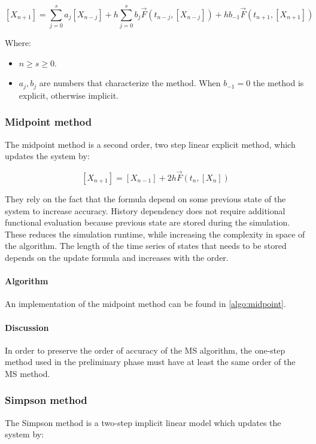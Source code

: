   $$[X_{n+1}] = \sum\limits_{j=0}^sa_j[X_{n-j}] + h\sum\limits_{j=0}^sb_j\vec{F}(t_{n-j}, [X_{n-j}]) + hb_{-1}\vec{F}(t_{n+1}, [X_{n+1}])$$

  Where:

  \begin{multicols}{2}
    \begin{itemize}
      \item $n\ge s\ge 0$.
      \item $a_j, b_j$ are numbers that characterize the method.
        When $b_{-1}= 0$ the method is explicit, otherwise implicit.
    \end{itemize}
  \end{multicols}

    \subsubsection{Midpoint method}
    The midpoint method is a second order, two step linear explicit method, which updates the system by:

    $$[X_{n+1}] = [X_{n-1}] + 2h\vec{F}(t_n, [X_n])$$

    They rely on the fact that the formula depend on some previous state of the system to increase accuracy.
    History dependency does not require additional functional evaluation because previous state are stored during the simulation.
    These reduces the simulation runtime, while increasing the complexity in space of the algorithm.
    The length of the time series of states that needs to be stored  depends on the update formula and increases with the order.

      \paragraph{Algorithm}
      An implementation of the midpoint method can be found in \ref{algo:midpoint}.

      

      \paragraph{Discussion}
      In order to preserve the order of accuracy of the MS algorithm, the one-step method used in the preliminary phase must have at least the same order of the MS method.

    \subsubsection{Simpson method}
    The Simpson method is a two-step implicit linear model which updates the system by:

